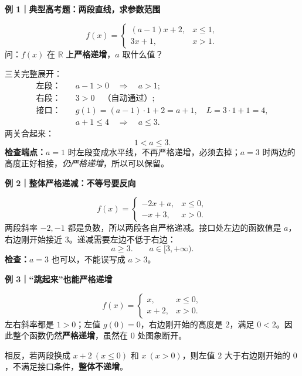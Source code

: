 \clearpage
\begin{examplebox}
\textbf{\textcolor{CExample}{例 1｜典型高考题：两段直线，求参数范围}}



\[
 f(x)=\begin{cases}(a-1)x+2,&x\le1,\\3x+1,&x>1.\end{cases}
\]
问：$f(x)$ 在 $\mathbb R$ 上\textbf{严格递增}，$a$ 取什么值？

三关完整展开：
\[
\begin{aligned}
\text{左段：}\quad &a-1>0\quad\Longrightarrow\quad a>1;\\
\text{右段：}\quad &3>0\quad\text{（自动通过）};\\
\text{接口：}\quad &g(1)=(a-1)\cdot1+2=a+1,\quad L=3\cdot1+1=4,\\
&a+1\le4\quad\Longrightarrow\quad a\le3.
\end{aligned}
\]
两关合起来：\[\boxed{1<a\le3}.\]
\textbf{检查端点：}$a=1$ 时左段变成水平线，不再严格递增，必须去掉；$a=3$ 时两边的高度正好相接，\emph{仍严格递增}，所以可以保留。

\medskip
\end{examplebox}
\clearpage
\begin{examplebox}
\textbf{\textcolor{CExample}{例 2｜整体严格递减：不等号要反向}}


\[
 f(x)=\begin{cases}-2x+a,&x\le0,\\-x+3,&x>0.\end{cases}
\]
两段斜率 $-2,-1$ 都是负数，所以两段各自严格递减。接口处左边的函数值是 $a$，右边刚开始接近 $3$。递减需要左边不低于右边：
\[
 a\ge3.\qquad\boxed{a\in[3,+\infty)}.
\]
\textbf{检查：}$a=3$ 也可以，不能误写成 $a>3$。

\medskip
\end{examplebox}
\clearpage
\begin{examplebox}
\textbf{\textcolor{CExample}{例 3｜“跳起来”也能严格递增}}


\[
 f(x)=\begin{cases}x,&x\le0,\\x+2,&x>0.\end{cases}
\]
左右斜率都是 $1>0$；左值 $g(0)=0$，右边刚开始的高度是 $2$，满足 $0<2$。因此整个函数仍然\textbf{严格递增}，虽然在 $0$ 处图象断开。

相反，若两段换成 $x+2\ (x\le0)$ 和 $x\ (x>0)$，则左值 $2$ 大于右边刚开始的 $0$，不满足接口条件，\textbf{整体不递增}。

\medskip
\end{examplebox}
